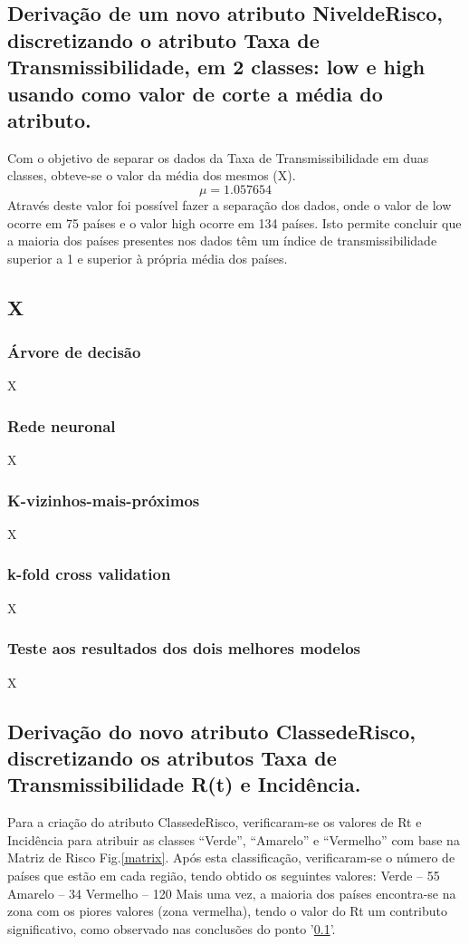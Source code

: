 \documentclass[conference]{IEEEtran}
\begin{document}
\subsection{Derivação de um novo atributo NiveldeRisco, discretizando o atributo Taxa de Transmissibilidade, em 2 classes: low e high usando como valor de corte a média do atributo.}
\label{ex05}
Com o objetivo de separar os dados da Taxa de Transmissibilidade em duas classes, obteve-se o valor da média dos mesmos (X).
\begin{equation}
\mu = 1.057654\label{4_ttest}
\end{equation}
Através deste valor foi possível fazer a separação dos dados, onde o valor de low ocorre em 75 países e o valor high ocorre em 134 países. Isto permite concluir que a maioria dos países presentes nos dados têm um índice de transmissibilidade superior a 1 e superior à própria média dos países.


\subsection{X}
\subsubsection{Árvore de decisão}
X


\subsubsection{Rede neuronal}
X


\subsubsection{K-vizinhos-mais-próximos}
X


\subsubsection{k-fold cross validation}
X

\subsubsection{Teste aos resultados dos dois melhores modelos}
X


\subsection{Derivação do novo atributo ClassedeRisco, discretizando os atributos Taxa de Transmissibilidade R(t) e Incidência.}
Para a criação do atributo ClassedeRisco, verificaram-se os valores de Rt e Incidência para atribuir as classes “Verde”, “Amarelo” e “Vermelho” com base na Matriz de Risco Fig.\ref{matrix}.
Após esta classificação, verificaram-se o número de países que estão em cada região, tendo obtido os seguintes valores:
Verde – 55
Amarelo – 34
Vermelho – 120
Mais uma vez, a maioria dos países encontra-se na zona com os piores valores (zona vermelha), tendo o valor do Rt um contributo significativo, como observado nas conclusões do ponto '\ref{ex05}'.
\end{document}
